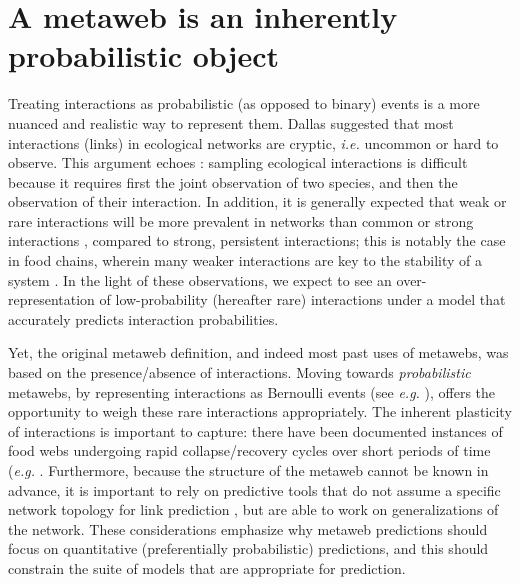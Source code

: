 \section{A metaweb is an inherently probabilistic
object}\label{a-metaweb-is-an-inherently-probabilistic-object}

Treating interactions as probabilistic (as opposed to binary) events is
a more nuanced and realistic way to represent them.
Dallas\cite{Dallas2017Predicting} suggested that most interactions (links) in
ecological networks are cryptic, \emph{i.e.} uncommon or hard to
observe. This argument echoes \cite{Jordano2016Sampling}: sampling ecological
interactions is difficult because it requires first the joint
observation of two species, and then the observation of their
interaction. In addition, it is generally expected that weak or rare
interactions will be more prevalent in networks than common or strong
interactions \cite{Csermely2004Strong}, compared to strong, persistent
interactions; this is notably the case in food chains, wherein many
weaker interactions are key to the stability of a system
\cite{Neutel2002Stability}. In the light of these observations, we
expect to see an over-representation of low-probability (hereafter rare)
interactions under a model that accurately predicts interaction
probabilities.

Yet, the original metaweb definition, and indeed most past uses of
metawebs, was based on the presence/absence of interactions. Moving
towards \emph{probabilistic} metawebs, by representing interactions as
Bernoulli events (see \emph{e.g.} \cite{Poisot2016Structure}), offers the
opportunity to weigh these rare interactions appropriately. The inherent
plasticity of interactions is important to capture: there have been
documented instances of food webs undergoing rapid collapse/recovery
cycles over short periods of time (\emph{e.g.} \cite{Pedersen2017Signatures}.
Furthermore, because the structure of the metaweb cannot be known in
advance, it is important to rely on predictive tools that do not assume
a specific network topology for link prediction
\cite{Gaucher2021Outlier}, but are able to work on generalizations of
the network. These considerations emphasize why metaweb predictions
should focus on quantitative (preferentially probabilistic) predictions,
and this should constrain the suite of models that are appropriate for
prediction.

